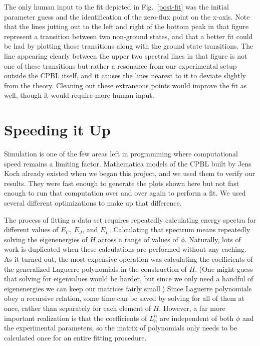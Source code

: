 \documentclass[twocolumn]{revtex4}
\begin{document}
The only human input to the fit depicted in Fig.~\ref{post-fit} was
the initial parameter guess and the identification of the zero-flux
point on the x-axis. Note that the lines jutting out to the left and
right of the bottom peak in that figure represent a transition between
two non-ground states, and that a better fit could be had by plotting
those transitions along with the ground state transitions. The line
appearing clearly between the upper two spectral lines in that figure
is not one of these transitions but rather a resonance from our
experimental setup outside the CPBL itself, and it causes the lines
nearest to it to deviate slightly from the theory. Cleaning out these
extraneous points would improve the fit as well, though it would
require more human input.

\section{Speeding it Up}

Simulation is one of the few areas left in programming where
computational speed remains a limiting factor. Mathematica models of
the CPBL built by Jens Koch already existed when we began this
project, and we used them to verify our results. They were fast enough
to generate the plots shown here but not fast enough to run that
computation over and over again to perform a fit. We used several
different optimizations to make up that difference.

The process of fitting a data set requires repeatedly calculating
energy spectra for different values of $E_C$, $E_J$, and
$E_L$. Calculating that spectrum means repeatedly solving the
eigenenergies of $H$ across a range of values of $\phi$. Naturally,
lots of work is duplicated when these calculations are performed
without any caching. As it turned out, the most expensive operation
was calculating the coefficients of the generalized Laguerre
polynomials in the construction of $H$. (One might guess that solving
for eigenvalues would be harder, but since we only need a handful of
eigenenergies we can keep our matrices fairly small.) Since Laguerre
polynomials obey a recursive relation, some time can be saved by
solving for all of them at once, rather than separately for each
element of $H$. However, a far more important realization is that the
coefficients of $L_n^\alpha$ are independent of both $\phi$ and the
experimental parameters, so the matrix of polynomials only needs to be
calculated once for an entire fitting procedure.
\end{document}
